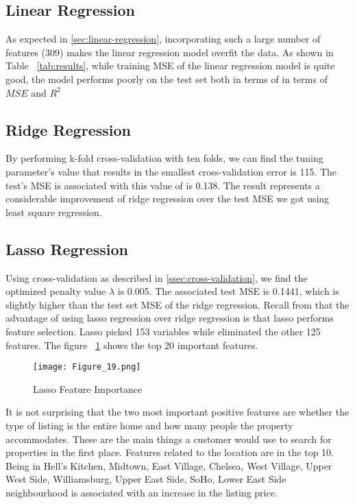 \subsection{Linear Regression}

As expected in \ref{sec:linear-regression}, incorporating such a large number of
features (309) makes the linear regression model overfit the data. As shown in
Table ~\ref{tab:results}, while training MSE of the linear regression model is
quite good, the model performs poorly on the test set both in terms of   in
terms of $MSE$ and $R^2$

\subsection{Ridge Regression}

By performing k-fold cross-validation with ten folds, we can find the tuning
parameter's value that results in the smallest cross-validation error is 115.
The test's MSE is associated with this value of  is 0.138.  The result
represents a considerable improvement of ridge regression over the test MSE we
got using least square regression.


\subsection{Lasso Regression}

Using cross-validation as described in \ref{ssec:cross-validation}, we find the
optimized penalty value $\lambda$ is 0.005. The associated test MSE is 0.1441,
which is slightly higher than the test set MSE of the ridge regression.  Recall
from that the advantage of using lasso regression over ridge regression is that
lasso performs feature selection.
Lasso picked 153 variables while eliminated the other 125 features.
The figure ~\ref{fig:lasso-feature-importantance} shows the top 20 important features.

\begin{figure}[h]\centering
    \caption{Lasso Feature Importance}
    \texttt{[image: Figure\_19.png]}
    \label{fig:lasso-feature-importantance}
\end{figure}

It is not surprising that the two most important positive features are whether
the type of listing is the entire home and how many people the property
accommodates. These are the main things a customer would use to search for
properties in the first place.
Features related to the location are in the top 10.  Being in  Hell's
Kitchen, Midtown, East Village, Chelsea, West Village, Upper West Side,
Williamsburg, Upper East Side, SoHo, Lower East Side neighbourhood is associated
with an increase in the listing price.

